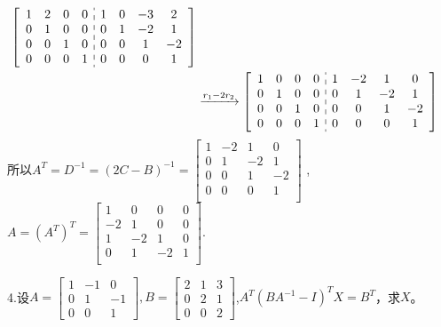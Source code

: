 \documentclass{article}
\begin{document}
\begin{jie}
\begin{align*}
{\left[
\begin{array}{c:c}
\begin{matrix}
  1 & 2 & 0 & 0\\
  0 & 1 & 0 & 0\\
  0 & 0 & 1 & 0\\
  0 & 0 & 0 & 1\\
\end{matrix} &
\begin{matrix}
  1 & 0 & -3 & 2\\
  0 & 1 & -2 & 1\\
  0 & 0 & 1 & -2\\
  0 & 0 & 0 & 1\\
\end{matrix}
\end{array}
\right]
}\\
&\xrightarrow{\substack{r_{1}-2r_{2}}}
{\left[
\begin{array}{c:c}
\begin{matrix}
  1 & 0 & 0 & 0\\
  0 & 1 & 0 & 0\\
  0 & 0 & 1 & 0\\
  0 & 0 & 0 & 1\\
\end{matrix} &
\begin{matrix}
  1 & -2 & 1 & 0\\
  0 & 1 & -2 & 1\\
  0 & 0 & 1 & -2\\
  0 & 0 & 0 & 1\\
\end{matrix}
\end{array}
\right]
}
\end{align*}
所以$A^{T}=D^{-1}=(2C-B)^{-1}=\begin{bmatrix}
  1 & -2 & 1 & 0\\
  0 & 1 & -2 & 1\\
  0 & 0 & 1 & -2\\
  0 & 0 & 0 & 1\\
\end{bmatrix}$
,$
  A=(A^{T})^{T}=\begin{bmatrix}
  1 & 0 & 0 & 0\\
  -2 & 1 & 0 & 0\\
  1 & -2 & 1 & 0\\
  0 & 1 & -2 & 1\\
\end{bmatrix}
.$
\end{jie}

4.设$
A=
\begin{bmatrix}
  1 & -1 & 0 \\
  0 & 1 & -1\\
  0 & 0 & 1
\end{bmatrix},B=
\begin{bmatrix}
  2 & 1 & 3 \\
  0 & 2 & 1\\
  0 & 0 & 2
\end{bmatrix}
$,$A^{T}(BA^{-1}-I)^{T}X=B^{T}$，求$X$。
\end{document}
